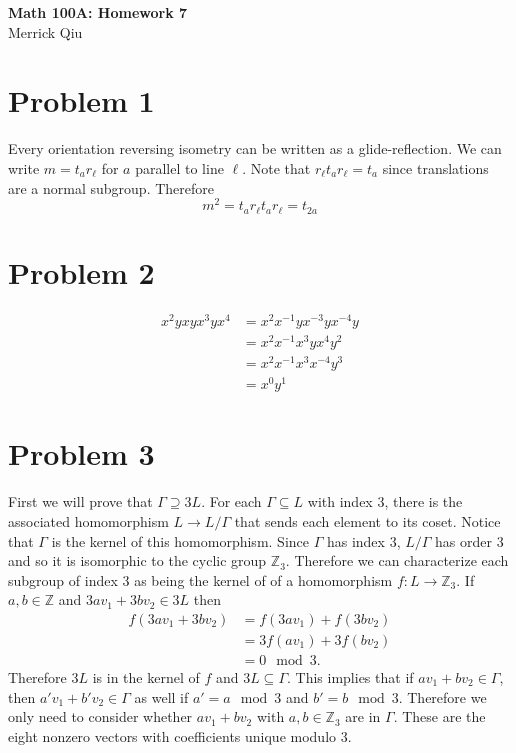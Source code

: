 \documentclass{article}
\begin{document}
\begin{center}
	\huge{\bf Math 100A: Homework 7} \\
	Merrick Qiu
\end{center}

\section*{Problem 1}
Every orientation reversing isometry can 
be written as a glide-reflection.
We can write $m = t_a r_\ell$ for $a$ parallel to line $\ell$.
Note that $r_\ell t_a r_\ell = t_a$ since translations are a normal subgroup.
Therefore 
\[
	m^2 = t_a r_\ell t_a r_\ell = t_{2a}
\]
\newpage

\section*{Problem 2}
\begin{align*}
	x^2yxyx^3yx^4 &= x^2x^{-1}yx^{-3}yx^{-4}y \\
	&= x^2x^{-1}x^{3}yx^{4}y^2 \\ 
	&= x^2x^{-1}x^{3}x^{-4}y^3 \\ 
	&= x^0y^1
\end{align*}
\newpage 

\section*{Problem 3}
First we will prove that $\Gamma \supseteq 3L$.
For each $\Gamma \subseteq L$ with index 3, there is the
associated homomorphism $L \to L/\Gamma$ that sends each element to its coset.
Notice that $\Gamma$ is the kernel of this homomorphism.
Since $\Gamma$ has index 3, $L/\Gamma$ has order 3
and so it is isomorphic to the cyclic group $\mathbb{Z}_3$.
Therefore we can characterize each subgroup of index 3 as being the kernel
of of a homomorphism $f: L \to \mathbb{Z}_3$.
If $a,b \in \mathbb{Z}$ and $3av_1 + 3bv_2 \in 3L$ then
\begin{align*}
	f(3av_1 + 3bv_2) &= f(3av_1) + f(3bv_2) \\
	 &= 3f(av_1) + 3f(bv_2) \\
	 &= 0 \mod 3.
\end{align*}
Therefore $3L$ is in the kernel of $f$ and $3L \subseteq \Gamma$.
This implies that if $av_1 + bv_2 \in \Gamma$, then 
$a'v_1 + b'v_2 \in \Gamma$ as well if $a' = a \mod 3$ and $b' = b \mod 3$.
Therefore we only need to consider whether 
$av_1 + bv_2$ with $a,b \in \mathbb{Z}_3$ are in $\Gamma$.
These are the eight nonzero vectors with coefficients unique modulo $3$.
\end{document}
